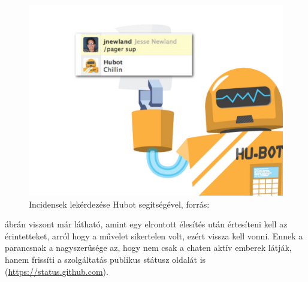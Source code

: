 \begin{figure}[H]
  \centering
    \includegraphics[scale=1.4]{assets/pager_sup.jpg}%
    \caption[DUMMY]%
    {Incidensek lekérdezése Hubot segítségével, forrás: \cite[p.~83]{what_is_chatops_slideshow}}%
    \label{fig:pager_sup}
\end{figure}

 ábrán viszont már látható, amint egy elrontott élesítés után értesíteni kell az érintetteket, arról hogy a művelet sikertelen volt, ezért vissza kell vonni. Ennek a parancsnak a nagyszerűsége az, hogy nem csak a chaten aktív emberek látják, hanem frissíti a szolgáltatás publikus státusz oldalát is (\url{https://status.github.com}).

